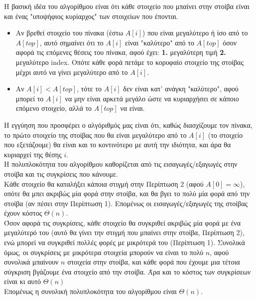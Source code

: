 		Η βασική ιδέα του αλγορίθμου είναι ότι κάθε στοιχείο που μπαίνει στην στοίβα είναι και ένας "υποψήφιος κυρίαρχος" των στοιχείων που έπονται. 
		\begin{itemize}
			\item Αν βρεθεί στοιχείο του πίνακα (έστω $A[i]$) που είναι μεγαλύτερο ή ίσο από το $A[top]$, αυτό σημαίνει ότι το $A[i]$ είναι "καλύτερο" από το $A[top]$ όσον αφορά τις επόμενες θέσεις του πίνακα, αφού έχει: \textbf{1.} μεγαλύτερη τιμή \textbf{2.} μεγαλύτερο index. Οπότε κάθε φορά πετάμε το κορυφαίο στοιχείο της στοίβας μέχρι αυτό να γίνει μεγαλύτερο από το $A[i]$.
			\item Αν $A[i] < A[top]$, τότε το $A[i]$ δεν είναι κατ' ανάγκη "καλύτερο", αφού μπορεί το $A[i]$ να μην είναι αρκετά μεγάλο ώστε να κυριαρχήσει σε κάποιο επόμενο στοιχείο, αλλά το $A[top]$ να είναι.
		\end{itemize}
		  Η εγγύηση που προσφέρει ο αλγόριθμός μας είναι ότι, καθώς διασχίζουμε τον πίνακα, το πρώτο στοιχείο της στοίβας που θα είναι μεγαλύτερο από το $A[i]$ (το στοιχείο που εξετάζουμε) θα είναι και το κοντινότερο με αυτή την ιδιότητα, και άρα θα κυριαρχεί της θέσης $i$. \\ 
		  
		  Η πολυπλοκότητα του αλγορίθμου καθορίζεται από τις εισαγωγές/εξαγωγές στην στοίβα και τις συγκρίσεις που κάνουμε. \\
		  
		  Κάθε στοιχείο θα καταλήξει κάποια στιγμή στην Περίπτωση 2 (αφού $Α[0] = \infty$), οπότε θα μπει ακριβώς μία φορά στην στοίβα, και θα βγει το πολύ μία φορά από την στοίβα (αν πέσει στην Περίπτωση 1). Επομένως οι εισαγωγές/εξαγωγές της στοίβας έχουν κόστος $Θ(n)$. \\
		  
		  Όσον αφορά τις συγκρίσεις, κάθε στοιχείο θα συγκριθεί ακριβώς μία φορά με ένα μεγαλύτερό του (αυτό θα γίνει την στιγμή που μπαίνει στην στοίβα, Περίπτωση 2), ενώ μπορεί να συγκριθεί πολλές φορές με μικρότερά του (Περίπτωση 1). Συνολικά όμως, οι συγκρίσεις με μικρότερα στοιχεία μπορούν να είναι το πολύ $n$, αφού συνολικά μπαίνουν $n$ στοιχεία στην στοίβα, και κάθε φορά που έχουμε μια τέτοια σύγκριση βγάζουμε ένα στοιχείο από την στοίβα. Άρα και το κόστος των συγκρίσεων είναι κι αυτό $Θ(n)$ \\
		  
		  Επομένως η συνολική πολυπλοκότητα του αλγορίθμου είναι $Θ(n)$.
	
